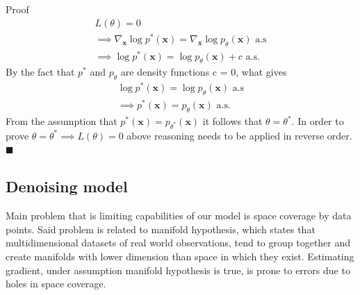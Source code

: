 \documentclass[10pt]{article}
\begin{document}
Proof \\
\begin{gather}
 L(\theta) = 0 \\
 \implies \nabla_{\textbf{x}} \log p^*(\textbf{x}) =\nabla_{\textbf{x}} \log p_{\theta}(\textbf{x}) \text{ a.s} \\
 \implies  \log p^*(\textbf{x}) =\log p_{\theta}(\textbf{x}) + c \text{ a.s}.
\end{gather}
By the fact that $ p^*$ and $ p_{\theta}$ are density functions c = 0, what gives
\begin{gather}
\log p^*(\textbf{x}) =\log p_{\theta}(\textbf{x}) \text{ a.s}  \\
\implies p^*(\textbf{x}) =  p_{\theta}(\textbf{x}) \text{ a.s}.
\end{gather}
From the assumption that $p^*(\textbf{x}) = p_{\theta^*}(\textbf{x})$ it follows that $\theta = \theta^*$. In order to prove
$\theta = \theta^* \implies  L(\theta) = 0 $ above reasoning needs to be applied in reverse order.
$\blacksquare$
\subsection{Denoising model}
Main problem that is limiting capabilities of our model is space coverage by data points. Said problem is related to manifold hypothesis, which states that multidimensional datasets of real world observations, tend to group together and create manifolds with lower dimension than space in which they exist. Estimating gradient, under assumption manifold hypothesis is true, is prone to errors due to holes in space coverage. 
\end{document}
